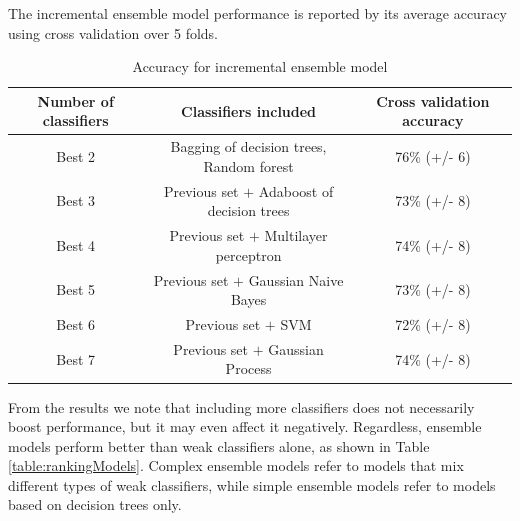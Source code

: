 \documentclass{article}
\begin{document}
The incremental ensemble model performance is reported by its average accuracy using cross validation over 5 folds. 

\begin{table}[H]
\centering
\begin{tabular}{||c|c|c||}
\hline
\textbf{Number of classifiers} & \textbf{Classifiers included} & \textbf{Cross validation accuracy} \\ [0.5ex] 
\hline \hline
Best 2 & {Bagging of decision trees, Random forest} & 76\% (+/- 6)\\
Best 3 & Previous set $+$ {Adaboost of decision trees} & 73\% (+/- 8)\\
Best 4 & Previous set $+$ {Multilayer perceptron} & 74\% (+/- 8)\\
Best 5 & Previous set $+$ {Gaussian Naive Bayes} & 73\% (+/- 8)\\
Best 6 & Previous set $+$ {SVM} & 72\% (+/- 8)\\
Best 7 & Previous set $+$ {Gaussian Process} & 74\% (+/- 8)\\ [1ex]
\hline 
\end{tabular}
\caption{Accuracy for incremental ensemble model}
\label{table:ensembleModels}
\end{table}

From the results we note that including more classifiers does not necessarily boost performance, but it may even affect it negatively. Regardless, ensemble models perform better than weak classifiers alone, as shown in Table \ref{table:rankingModels}. Complex ensemble models refer to models that mix different types of weak classifiers, while simple ensemble models refer to models based on decision trees only. 
\end{document}
